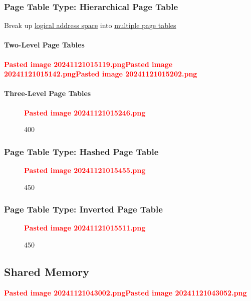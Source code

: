 \subsubsection*{Page Table Type: Hierarchical Page Table}

Break up \ul{logical address space} into \ul{multiple page tables}

\paragraph*{Two-Level Page Tables}

\textcolor{red}{\textbf{Pasted image 20241121015119.png}}\textcolor{red}{\textbf{Pasted image 20241121015142.png}}\textcolor{red}{\textbf{Pasted image 20241121015202.png}}

\paragraph*{Three-Level Page Tables}

\begin{figure}
\centering
\textcolor{red}{\textbf{Pasted image 20241121015246.png}}
\caption{400}
\end{figure}

\subsubsection*{Page Table Type: Hashed Page Table}

\begin{figure}
\centering
\textcolor{red}{\textbf{Pasted image 20241121015455.png}}
\caption{450}
\end{figure}

\subsubsection*{Page Table Type: Inverted Page Table}

\begin{figure}
\centering
\textcolor{red}{\textbf{Pasted image 20241121015511.png}}
\caption{450}
\end{figure}

\subsection*{Shared Memory}

\textcolor{red}{\textbf{Pasted image 20241121043002.png}}\textcolor{red}{\textbf{Pasted image 20241121043052.png}}

